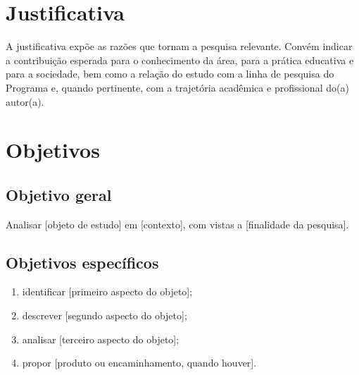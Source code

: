 \section{Justificativa}
\label{sec:justificativa}

A justificativa expõe as razões que tornam a pesquisa relevante. Convém indicar a contribuição esperada para o conhecimento da área, para a prática educativa e para a sociedade, bem como a relação do estudo com a linha de pesquisa do Programa e, quando pertinente, com a trajetória acadêmica e profissional do(a) autor(a).

\section{Objetivos}
\label{sec:objetivos}

\subsection{Objetivo geral}

Analisar [objeto de estudo] em [contexto], com vistas a [finalidade da pesquisa].

\subsection{Objetivos específicos}

\begin{enumerate}[label=\alph*), leftmargin=1.25cm+\labelwidth, itemsep=0pt]
  \item identificar [primeiro aspecto do objeto];
  \item descrever [segundo aspecto do objeto];
  \item analisar [terceiro aspecto do objeto];
  \item propor [produto ou encaminhamento, quando houver].
\end{enumerate}

